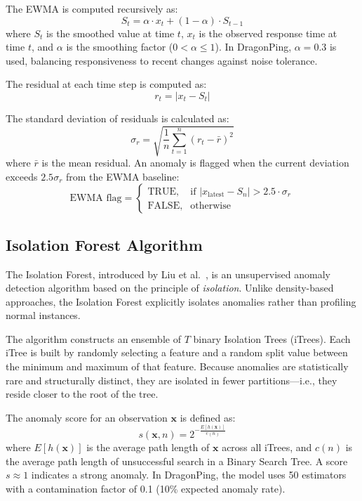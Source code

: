 \documentclass[12pt,a4paper,oneside]{report}
\begin{document}
\noindent The EWMA is computed recursively as:
\begin{equation}
\label{eq:ewma}
S_t = \alpha \cdot x_t + (1 - \alpha) \cdot S_{t-1}
\end{equation}
where $S_t$ is the smoothed value at time $t$, $x_t$ is the observed response time at time $t$, and $\alpha$ is the smoothing factor ($0 < \alpha \leq 1$). In DragonPing, $\alpha = 0.3$ is used, balancing responsiveness to recent changes against noise tolerance.

\noindent The residual at each time step is computed as:
\begin{equation}
r_t = |x_t - S_t|
\end{equation}

\noindent The standard deviation of residuals is calculated as:
\begin{equation}
\sigma_r = \sqrt{\frac{1}{n} \sum_{t=1}^{n} (r_t - \bar{r})^2}
\end{equation}
where $\bar{r}$ is the mean residual. An anomaly is flagged when the current deviation exceeds $2.5\sigma_r$ from the EWMA baseline:
\begin{equation}
\text{EWMA flag} = \begin{cases} \text{TRUE}, & \text{if } |x_\text{latest} - S_n| > 2.5 \cdot \sigma_r \\ \text{FALSE}, & \text{otherwise} \end{cases}
\end{equation}

\subsection{Isolation Forest Algorithm}
\noindent The Isolation Forest, introduced by Liu et al.\ \cite{isolation_forest}, is an unsupervised anomaly detection algorithm based on the principle of \textit{isolation}. Unlike density-based approaches, the Isolation Forest explicitly isolates anomalies rather than profiling normal instances.

\noindent The algorithm constructs an ensemble of $T$ binary Isolation Trees (iTrees). Each iTree is built by randomly selecting a feature and a random split value between the minimum and maximum of that feature. Because anomalies are statistically rare and structurally distinct, they are isolated in fewer partitions---i.e., they reside closer to the root of the tree.

\noindent The anomaly score for an observation $\mathbf{x}$ is defined as:
\begin{equation}
s(\mathbf{x}, n) = 2^{-\frac{E[h(\mathbf{x})]}{c(n)}}
\end{equation}
where $E[h(\mathbf{x})]$ is the average path length of $\mathbf{x}$ across all iTrees, and $c(n)$ is the average path length of unsuccessful search in a Binary Search Tree. A score $s \approx 1$ indicates a strong anomaly. In DragonPing, the model uses 50 estimators with a contamination factor of 0.1 (10\% expected anomaly rate).
\end{document}
